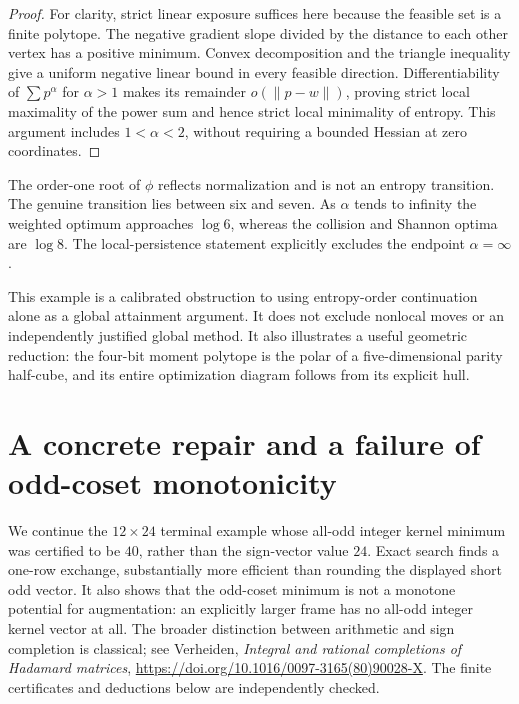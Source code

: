 \documentclass[11pt]{article}
\begin{document}
\begin{proof}
For clarity, strict linear exposure suffices here because the feasible
set is a finite polytope. The negative gradient slope divided by the
distance to each other vertex has a positive minimum. Convex
decomposition and the triangle inequality give a uniform negative
linear bound in every feasible direction. Differentiability of
$\sum p^\alpha$ for $\alpha>1$ makes its remainder $o(\|p-w\|)$,
proving strict local maximality of the power sum and hence strict
local minimality of entropy. This argument includes $1<\alpha<2$,
without requiring a bounded Hessian at zero coordinates.
\end{proof}

The order-one root of $\phi$ reflects normalization and is not an
entropy transition. The genuine transition lies between six and seven.
As $\alpha$ tends to infinity the weighted optimum approaches
$\log6$, whereas the collision and Shannon optima are $\log8$.
The local-persistence statement explicitly excludes the endpoint
$\alpha=\infty$.

This example is a calibrated obstruction to using entropy-order
continuation alone as a global attainment argument. It does not
exclude nonlocal moves or an independently justified global method.
It also illustrates a useful geometric reduction: the four-bit
moment polytope is the polar of a five-dimensional parity half-cube,
and its entire optimization diagram follows from its explicit hull.
\section{A concrete repair and a failure of odd-coset monotonicity}
\label{sec:odd-coset-repair}

We continue the $12\times24$ terminal example whose all-odd integer
kernel minimum was certified to be $40$, rather than the sign-vector
value $24$. Exact search finds a one-row exchange, substantially more
efficient than rounding the displayed short odd vector. It also shows
that the odd-coset minimum is not a monotone potential for augmentation:
an explicitly larger frame has no all-odd integer kernel vector at all.
The broader distinction between arithmetic and sign completion is
classical; see Verheiden, \emph{Integral and rational completions of
Hadamard matrices},
\url{https://doi.org/10.1016/0097-3165(80)90028-X}.
The finite certificates and deductions below are independently checked.
\end{document}
